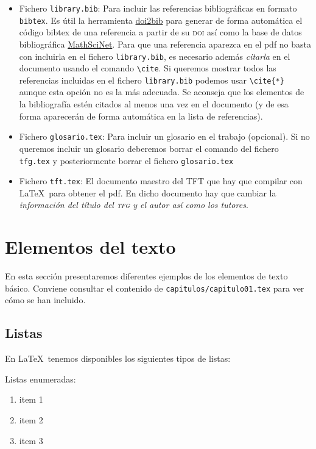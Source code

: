\begin{itemize}
  \item Fichero \texttt{library.bib}: Para incluir las referencias bibliográficas en formato \texttt{bibtex}. Es útil la herramienta \href{https://www.doi2bib.org/}{doi2bib} para generar de forma automática el código bibtex de una referencia a partir de su \textsc{doi}  así como la base de datos bibliográfica \href{https://mathscinet.ams.org}{MathSciNet}. Para que una referencia aparezca en el pdf no basta con incluirla en el fichero \texttt{library.bib}, es necesario además \emph{citarla} en el documento usando el comando \verb+\cite+. Si queremos mostrar todos las referencias incluidas en el fichero \texttt{library.bib} podemos usar \verb+\cite{*}+ aunque esta opción no es la más adecuada. Se aconseja que los elementos de la bibliografía estén citados al menos una vez en el documento (y de esa forma aparecerán de forma automática en la lista de referencias).

  \item Fichero \texttt{glosario.tex}: Para incluir un glosario en el trabajo (opcional). Si no queremos incluir un glosario deberemos borrar el comando \verb++ del fichero \texttt{tfg.tex} y posteriormente borrar el fichero \texttt{glosario.tex}

   \item Fichero \texttt{tft.tex}: El documento maestro del TFT que hay que compilar con \LaTeX\ para obtener el pdf. En dicho documento hay que cambiar la \emph{información del título del \textsc{tfg} y el autor así como los tutores}.
\end{itemize}



\section{Elementos del texto}

En esta sección presentaremos diferentes ejemplos de los elementos de texto básico. Conviene consultar el contenido de \texttt{capitulos/capitulo01.tex} para ver cómo se han incluido.

\subsection{Listas}
En \LaTeX\ tenemos disponibles los siguientes tipos de listas:

Listas enumeradas:
\begin{enumerate}
  \item item 1
  \item item 2
  \item item 3
\end{enumerate}

